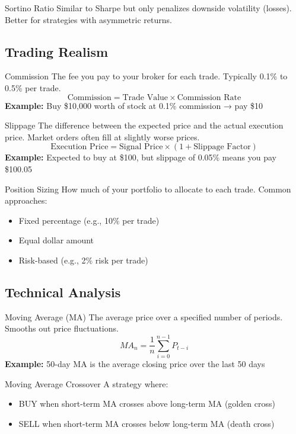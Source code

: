 \documentclass[11pt,a4paper]{article}
\begin{document}
\begin{keyterm}{Sortino Ratio}
Similar to Sharpe but only penalizes downside volatility (losses). Better for strategies with asymmetric returns.
\end{keyterm}

\subsection{Trading Realism}

\begin{keyterm}{Commission}
The fee you pay to your broker for each trade. Typically 0.1\% to 0.5\% per trade.
\[
\text{Commission} = \text{Trade Value} \times \text{Commission Rate}
\]
\textbf{Example:} Buy \$10,000 worth of stock at 0.1\% commission → pay \$10
\end{keyterm}

\begin{keyterm}{Slippage}
The difference between the expected price and the actual execution price. Market orders often fill at slightly worse prices.
\[
\text{Execution Price} = \text{Signal Price} \times (1 + \text{Slippage Factor})
\]
\textbf{Example:} Expected to buy at \$100, but slippage of 0.05\% means you pay \$100.05
\end{keyterm}

\begin{keyterm}{Position Sizing}
How much of your portfolio to allocate to each trade. Common approaches:
\begin{itemize}
  \item Fixed percentage (e.g., 10\% per trade)
  \item Equal dollar amount
  \item Risk-based (e.g., 2\% risk per trade)
\end{itemize}
\end{keyterm}

\subsection{Technical Analysis}

\begin{keyterm}{Moving Average (MA)}
The average price over a specified number of periods. Smooths out price fluctuations.
\[
MA_n = \frac{1}{n}\sum_{i=0}^{n-1} P_{t-i}
\]
\textbf{Example:} 50-day MA is the average closing price over the last 50 days
\end{keyterm}

\begin{keyterm}{Moving Average Crossover}
A strategy where:
\begin{itemize}
  \item BUY when short-term MA crosses above long-term MA (golden cross)
  \item SELL when short-term MA crosses below long-term MA (death cross)
\end{itemize}
\end{keyterm}
\end{document}
